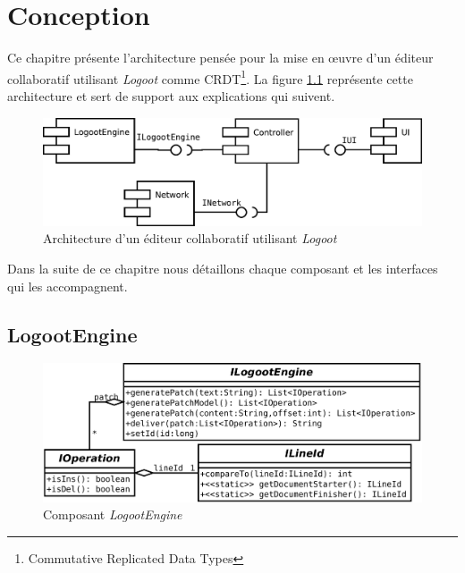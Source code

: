 \chapter{Conception}
\label{chap:Conception}
  Ce chapitre présente l'architecture pensée pour la mise en \oe{}uvre d'un
  éditeur collaboratif utilisant \emph{Logoot} comme CRDT\footnote{Commutative
  Replicated Data Types}. La figure \ref{fig:architecture} représente cette
  architecture et sert de support aux explications qui suivent.

  \begin{figure}[hbt]
    \label{fig:architecture}
    \includegraphics[width=\textwidth]{includes/architecture.pdf}
    \caption{Architecture d'un éditeur collaboratif utilisant \emph{Logoot}}
  \end{figure}

  Dans la suite de ce chapitre nous détaillons chaque composant et les
  interfaces qui les accompagnent.

  \section{LogootEngine}
  \begin{figure}[hbt]
    \center
    \includegraphics[width=.9\textwidth]{includes/model/ILogootEngine.pdf}
    \caption{Composant \emph{LogootEngine}}
    \label{fig:logootengine}
  \end{figure}

